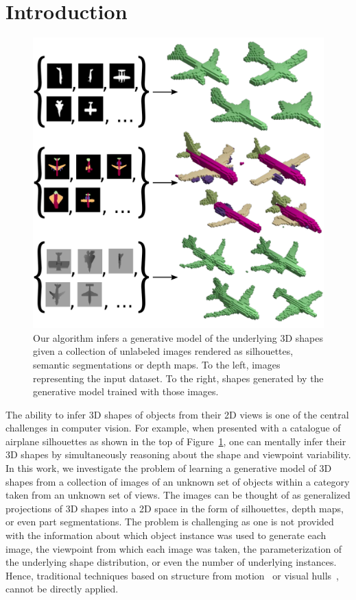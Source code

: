 \section{Introduction}\label{xs:intro}

\begin{figure}[t]
\centering
\includegraphics[width=0.5\linewidth]{prgan/fig/visabstract.pdf}
\caption{\label{f:problem} Our algorithm infers a generative model of
  the underlying 3D shapes given a collection of unlabeled images rendered as
  silhouettes, semantic segmentations or depth maps. 
	To the left, images representing the input dataset.
	To the right, shapes generated by the generative model trained with those images.}
\vspace{-12pt}
\end{figure}


The ability to infer 3D shapes of objects from their 2D views is one
of the central challenges in computer vision.
For example, when presented with a catalogue of airplane silhouettes
as shown in the top of Figure~\ref{f:problem}, one can mentally infer
their 3D shapes by simultaneously reasoning about the shape and
viewpoint variability.
In this work, we investigate the problem of learning a generative
model of 3D shapes from a collection of images of an unknown set of
objects within a category taken from an unknown set of views.
The images can be thought of as generalized projections of 3D shapes
into a 2D space in the form of silhouettes, depth maps,
or even part segmentations.
The problem is challenging as one is not provided with the information
about which object instance was used to generate each image, the viewpoint from
which each image was taken, the parameterization of the underlying shape
distribution, or even the number of underlying instances.
Hence, traditional techniques based on structure
from motion~\cite{hartley2003multiple,blanz1999morphable} or visual
hulls~\cite{laurentini1994visual}, cannot be directly applied.


